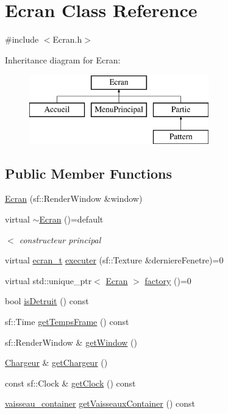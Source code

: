 \hypertarget{class_ecran}{}\section{Ecran Class Reference}
\label{class_ecran}


{\ttfamily \#include $<$Ecran.\+h$>$}

Inheritance diagram for Ecran\+:\begin{figure}[H]
\begin{center}
\leavevmode
\includegraphics[height=3.000000cm]{class_ecran}
\end{center}
\end{figure}
\subsection*{Public Member Functions}
\begin{DoxyCompactItemize}
\item 
\mbox{\hyperlink{class_ecran_a2ea4e1f23da32177ec9a1e4d02e87b46}{Ecran}} (sf\+::\+Render\+Window \&window)
\item 
virtual \mbox{\hyperlink{class_ecran_a00e529f95c3832a06f2d46b797d76072}{$\sim$\+Ecran}} ()=default
\begin{DoxyCompactList}\small\item\em $<$ constructeur principal \end{DoxyCompactList}\item 
virtual \mbox{\hyperlink{constantes_8h_a33e4f15dde10f34860a6b35be343ae56}{ecran\+\_\+t}} \mbox{\hyperlink{class_ecran_a764dadf20079744d3f5dd633eae268cc}{executer}} (sf\+::\+Texture \&derniere\+Fenetre)=0
\item 
virtual std\+::unique\+\_\+ptr$<$ \mbox{\hyperlink{class_ecran}{Ecran}} $>$ \mbox{\hyperlink{class_ecran_a016213731438ce2fb37831d8b0eeabed}{factory}} ()=0
\item 
bool \mbox{\hyperlink{class_ecran_a8ca7e9677252fef3a5e6aee60d27a9e3}{is\+Detruit}} () const
\item 
sf\+::\+Time \mbox{\hyperlink{class_ecran_a7fc62bede7a95d972326151446f4e75c}{get\+Temps\+Frame}} () const
\item 
sf\+::\+Render\+Window \& \mbox{\hyperlink{class_ecran_a735fe022858b847a019bf1a69e117f1a}{get\+Window}} ()
\item 
\mbox{\hyperlink{class_chargeur}{Chargeur}} \& \mbox{\hyperlink{class_ecran_a9b781eadd60c166948dc1ea2bc04194d}{get\+Chargeur}} ()
\item 
const sf\+::\+Clock \& \mbox{\hyperlink{class_ecran_ae9a020b22b2c022a082fa3d7566af0e9}{get\+Clock}} () const
\item 
\mbox{\hyperlink{def__type_8h_ad123ed7c93f42c8dd68e4af28b16b639}{vaisseau\+\_\+container}} \mbox{\hyperlink{class_ecran_a596618c9e9a039fef504c9dcc9c2addf}{get\+Vaisseaux\+Container}} () const
\end{DoxyCompactItemize}
